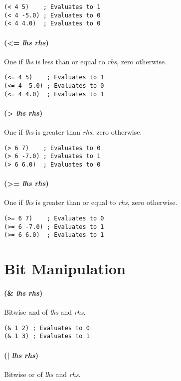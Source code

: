 \documentclass[twoside=false, numbers=noenddot]{scrbook}
\begin{document}
\begin{verbatim}
(< 4 5)    ; Evaluates to 1
(< 4 -5.0) ; Evaluates to 0
(< 4 4.0)  ; Evaluates to 0
\end{verbatim}

\paragraph{(<= \emph{lhs} \emph{rhs})}
One if \emph{lhs} is less than or equal to \emph{rhs}, zero otherwise.

\begin{verbatim}
(<= 4 5)    ; Evaluates to 1
(<= 4 -5.0) ; Evaluates to 0
(<= 4 4.0)  ; Evaluates to 1
\end{verbatim}

\paragraph{(> \emph{lhs} \emph{rhs})}
One if \emph{lhs} is greater than \emph{rhs}, zero otherwise.

\begin{verbatim}
(> 6 7)    ; Evaluates to 0
(> 6 -7.0) ; Evaluates to 1
(> 6 6.0)  ; Evaluates to 0
\end{verbatim}

\paragraph{(>= \emph{lhs} \emph{rhs})}
One if \emph{lhs} is greater than or equal to \emph{rhs}, zero otherwise.

\begin{verbatim}
(>= 6 7)    ; Evaluates to 0
(>= 6 -7.0) ; Evaluates to 1
(>= 6 6.0)  ; Evaluates to 1
\end{verbatim}

\section{Bit Manipulation}
\paragraph{(\& \emph{lhs} \emph{rhs})}
Bitwise and of \emph{lhs} and \emph{rhs}.

\begin{verbatim}
(& 1 2) ; Evaluates to 0
(& 1 3) ; Evaluates to 1
\end{verbatim}

\paragraph{(| \emph{lhs} \emph{rhs})}
Bitwise or of \emph{lhs} and \emph{rhs}.
\end{document}
